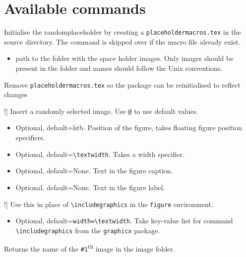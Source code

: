 \documentclass[12pt]{article}
\begin{document}
    \section{Available commands}
    \begin{description}
        \item[\lstinline!\placeholderinit{#1}!] 
        Initialise the randomplaceholder by creating a \linebreak \lstinline!placeholdermacros.tex! in the source directory. The command is skipped over if the macro file already exist.
            \begin{itemize}
                \item[\lstinline!#1!] path to the folder with the space holder images. Only images should be present in the folder and names should follow the Unix conventions.
            \end{itemize}
        \item[\lstinline!\placeholderclean!] Remove \lstinline!placeholdermacros.tex! so the package can be reinitialised to reflect changes 
        \item[\lstinline!\placeholder[#1][#2][#3][#4]!] Insert a randomly selected image. Use \lstinline{@} to use default values.
            \begin{itemize}
                \item[\lstinline{#1}] Optional, default=htb. Position of the figure, takes floating figure position specifiers.
                \item[\lstinline{#2}] Optional, default=\lstinline{\textwidth}. Takes a width specifier.
                \item[\lstinline{#3}] Optional, default=None. Text in the figure caption.
                \item[\lstinline{#4}] Optional, default=None. Text in the figure label.  
            \end{itemize}
        \item[\lstinline!\includeplaceholder[#1]!] Use this in place of \lstinline!\includegraphics! in the \lstinline{figure} environment.
            \begin{itemize}
                \item[\lstinline{#1}] Optional, default=\lstinline{width=\textwidth}. Take key-value list for command \lstinline{\includegraphics} from the \lstinline{graphicx} package.
            \end{itemize}
        \item[\lstinline!\placeholderimage{#1}!] Returns the name of the \lstinline{#1}\textsuperscript{th} image in the image folder. 
    \end{description}
\end{document}
